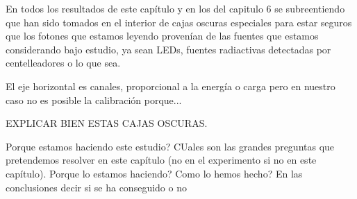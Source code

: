 En todos los resultados de este capítulo y en los del capitulo 6 se subreentiendo que han sido tomados en el interior de cajas oscuras especiales para estar seguros que los fotones que estamos leyendo provenían de las fuentes que estamos considerando bajo estudio, ya sean LEDs, fuentes radiactivas detectadas por centelleadores o lo que sea.

El eje horizontal es canales, proporcional a la energía o carga pero en nuestro caso no es posible la calibración porque...

EXPLICAR BIEN ESTAS CAJAS OSCURAS. 

Porque estamos haciendo este estudio?
CUales son las grandes preguntas que pretendemos resolver en este capítulo (no en el experimento si no en este capítulo). Porque lo estamos haciendo?
Como lo hemos hecho?
En las conclusiones decir si se ha conseguido o no